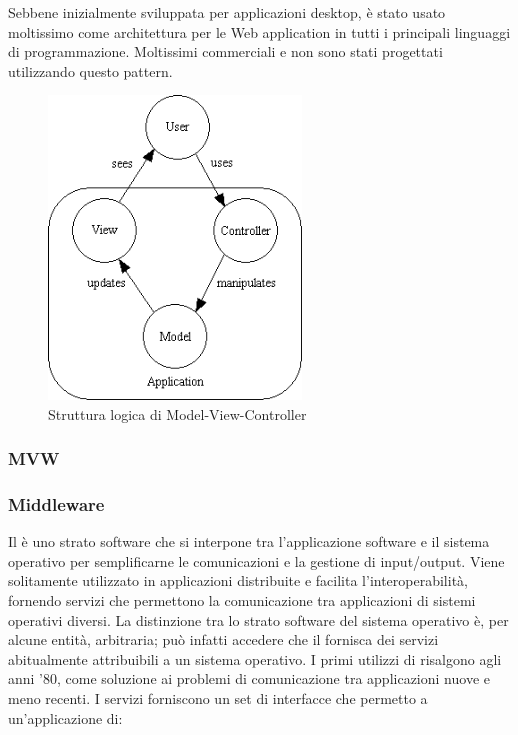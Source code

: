 Sebbene inizialmente sviluppata per applicazioni desktop,  è stato usato moltissimo come architettura per le Web application in tutti i principali linguaggi di programmazione. Moltissimi  commerciali e non sono stati progettati utilizzando questo pattern.

\begin{figure}[h]
\centering \includegraphics[width=0.6\textwidth]{patterns/mvc.png}
\caption{Struttura logica di Model-View-Controller}
\end{figure}

\subsubsection{MVW}

\subsubsection{Middleware} 
Il  è uno strato software che si interpone tra l'applicazione software e il sistema operativo per semplificarne le comunicazioni e la gestione di input/output. Viene solitamente utilizzato in applicazioni distribuite e facilita l'interoperabilità, fornendo servizi che permettono la comunicazione tra applicazioni di sistemi operativi diversi. La distinzione tra lo strato software del sistema operativo è, per alcune entità, arbitraria; può infatti accedere che il  fornisca dei servizi abitualmente attribuibili a un sistema operativo. I primi utilizzi di  risalgono agli anni '80, come soluzione ai problemi di comunicazione tra applicazioni nuove e meno recenti. I servizi  forniscono un set di interfacce che permetto a un'applicazione di:
	
